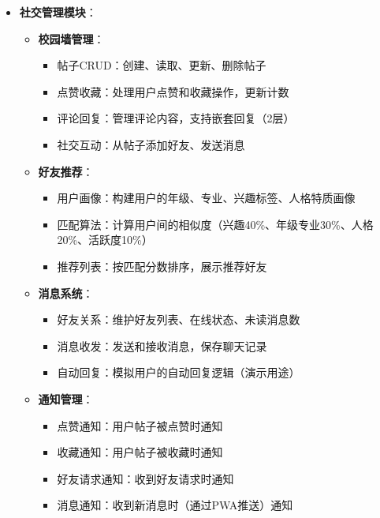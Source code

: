 \documentclass[12pt,a4paper]{article}
\begin{document}
\begin{itemize}
    \item \textbf{社交管理模块}：
        \begin{itemize}
            \item \textbf{校园墙管理}：
                \begin{itemize}
                    \item 帖子CRUD：创建、读取、更新、删除帖子
                    \item 点赞收藏：处理用户点赞和收藏操作，更新计数
                    \item 评论回复：管理评论内容，支持嵌套回复（2层）
                    \item 社交互动：从帖子添加好友、发送消息
                \end{itemize}
            \item \textbf{好友推荐}：
                \begin{itemize}
                    \item 用户画像：构建用户的年级、专业、兴趣标签、人格特质画像
                    \item 匹配算法：计算用户间的相似度（兴趣40\%、年级专业30\%、人格20\%、活跃度10\%）
                    \item 推荐列表：按匹配分数排序，展示推荐好友
                \end{itemize}
            \item \textbf{消息系统}：
                \begin{itemize}
                    \item 好友关系：维护好友列表、在线状态、未读消息数
                    \item 消息收发：发送和接收消息，保存聊天记录
                    \item 自动回复：模拟用户的自动回复逻辑（演示用途）
                \end{itemize}
            \item \textbf{通知管理}：
                \begin{itemize}
                    \item 点赞通知：用户帖子被点赞时通知
                    \item 收藏通知：用户帖子被收藏时通知
                    \item 好友请求通知：收到好友请求时通知
                    \item 消息通知：收到新消息时（通过PWA推送）通知
                \end{itemize}
        \end{itemize}
    

\end{itemize}
\end{document}
